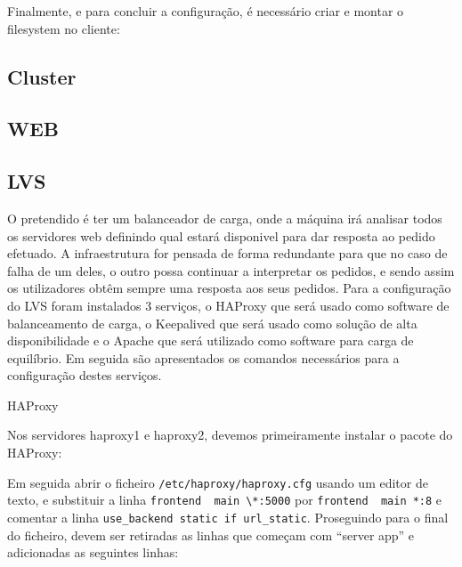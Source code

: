 Finalmente, e para concluir a configuração, é necessário criar e montar o filesystem no cliente:
 \par
{} \par
{} \par


\subsection{Cluster}

\subsection{WEB}

\subsection{LVS}
O pretendido é ter um balanceador de carga, onde a máquina irá analisar todos os servidores web definindo qual estará disponivel para dar resposta ao pedido efetuado.
A infraestrutura for pensada de forma redundante para que no caso de falha de um deles, o outro possa continuar a interpretar os pedidos, e sendo assim os utilizadores obtêm sempre uma resposta aos seus pedidos.
Para a configuração do LVS foram instalados 3 serviços, o HAProxy que será usado como software de balanceamento de carga, o Keepalived que será usado como solução de alta disponibilidade e o Apache que será utilizado como software para carga de equilíbrio. Em seguida são apresentados os comandos necessários para a configuração destes serviços.


HAProxy

Nos servidores haproxy1 e haproxy2, devemos primeiramente instalar o pacote do HAProxy:
 \par

Em seguida abrir o ficheiro \verb+/etc/haproxy/haproxy.cfg+ usando um editor de texto, e substituir a linha \verb+frontend  main \*:5000+ por \verb+frontend  main *:8+ e comentar a linha \verb+use_backend static if url_static+.
Proseguindo para o final do ficheiro, devem ser retiradas as linhas que começam com “server app” e adicionadas as seguintes linhas:
 \par
{} \par

